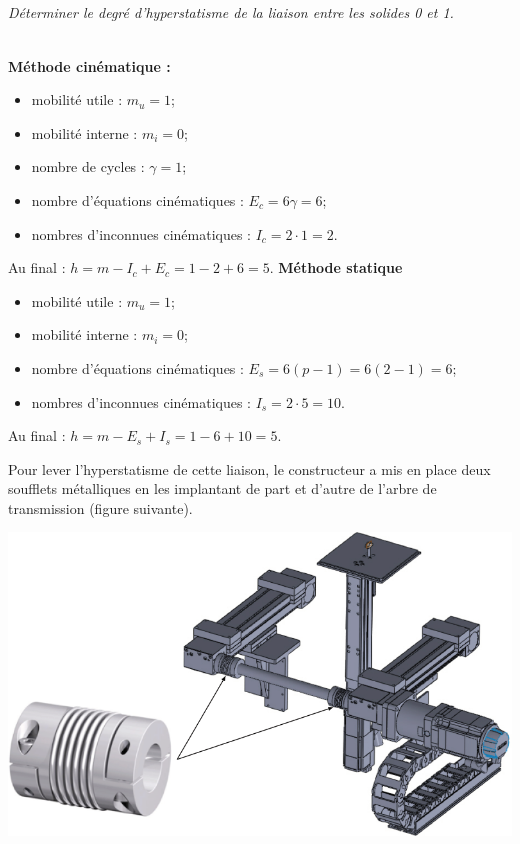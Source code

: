 \documentclass[10pt,fleqn]{article} %
\begin{document}
\begin{multicols}{2}
\subparagraph{}\textit{Déterminer le degré d’hyperstatisme de la liaison entre les solides 0 et 1.}
\ifprof
\begin{corrige} ~\\
\textbf{Méthode cinématique :}
\begin{itemize}
\item mobilité utile : $m_u=1$;
\item mobilité interne : $m_i=0$;
\item nombre de cycles : $\gamma = 1$;
\item nombre d'équations cinématiques : $E_c=6\gamma = 6$;
\item nombres d'inconnues cinématiques : $I_c=2\cdot 1=2$.
\end{itemize}
Au final : $h=m-I_c+E_c=1-2+6=5$.
\textbf{Méthode statique}
\begin{itemize}
\item mobilité utile : $m_u=1$;
\item mobilité interne : $m_i=0$;
\item nombre d'équations cinématiques : $E_s=6(p-1)=6(2-1)= 6$;
\item nombres d'inconnues cinématiques : $I_s=2\cdot 5 = 10$.
\end{itemize}
Au final : $h=m-E_s+I_s=1-6+10=5$.

\end{corrige}
\else
\fi


Pour lever l’hyperstatisme de cette liaison, le constructeur a mis en place deux soufflets métalliques en les implantant de part et d’autre de l’arbre de transmission (figure suivante).

\begin{center}
\includegraphics[width=\linewidth]{images/fig_06}
\end{center}


\end{multicols}
\end{document}
